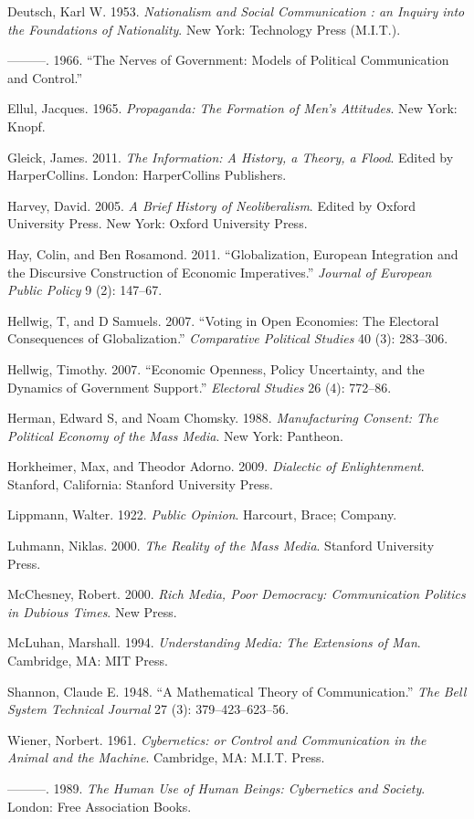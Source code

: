 \documentclass[12pt,book]{article}
\begin{document}
Deutsch, Karl W. 1953. \emph{Nationalism and Social Communication : an
Inquiry into the Foundations of Nationality}. New York: Technology Press
(M.I.T.).

---------. 1966. ``The Nerves of Government: Models of Political
Communication and Control.''

Ellul, Jacques. 1965. \emph{Propaganda: The Formation of Men's
Attitudes}. New York: Knopf.

Gleick, James. 2011. \emph{The Information: A History, a Theory, a
Flood}. Edited by HarperCollins. London: HarperCollins Publishers.

Harvey, David. 2005. \emph{A Brief History of Neoliberalism}. Edited by
Oxford University Press. New York: Oxford University Press.

Hay, Colin, and Ben Rosamond. 2011. ``Globalization, European
Integration and the Discursive Construction of Economic Imperatives.''
\emph{Journal of European Public Policy} 9 (2): 147--67.

Hellwig, T, and D Samuels. 2007. ``Voting in Open Economies: The
Electoral Consequences of Globalization.'' \emph{Comparative Political
Studies} 40 (3): 283--306.

Hellwig, Timothy. 2007. ``Economic Openness, Policy Uncertainty, and the
Dynamics of Government Support.'' \emph{Electoral Studies} 26 (4):
772--86.

Herman, Edward S, and Noam Chomsky. 1988. \emph{Manufacturing Consent:
The Political Economy of the Mass Media}. New York: Pantheon.

Horkheimer, Max, and Theodor Adorno. 2009. \emph{Dialectic of
Enlightenment}. Stanford, California: Stanford University Press.

Lippmann, Walter. 1922. \emph{Public Opinion}. Harcourt, Brace; Company.

Luhmann, Niklas. 2000. \emph{The Reality of the Mass Media}. Stanford
University Press.

McChesney, Robert. 2000. \emph{Rich Media, Poor Democracy: Communication
Politics in Dubious Times}. New Press.

McLuhan, Marshall. 1994. \emph{Understanding Media: The Extensions of
Man}. Cambridge, MA: MIT Press.

Shannon, Claude E. 1948. ``A Mathematical Theory of Communication.''
\emph{The Bell System Technical Journal} 27 (3): 379--423--623--56.

Wiener, Norbert. 1961. \emph{Cybernetics: or Control and Communication
in the Animal and the Machine}. Cambridge, MA: M.I.T. Press.

---------. 1989. \emph{The Human Use of Human Beings: Cybernetics and
Society}. London: Free Association Books.
\end{document}
